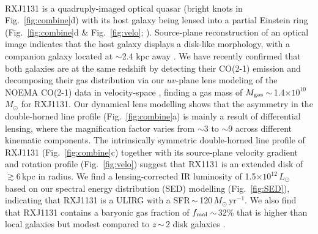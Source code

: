 \documentclass[11pt,a4paper,twoside,graphicx,color]{article}
\newcommand{\Lsun}{\mbox{$L_{\odot}$}\xspace}
\newcommand{\LIR}{\mbox{$L_{\rm IR}$}\xspace}
\newcommand{\Msun}{\mbox{$M_{\odot}$}\xspace}
\newcommand{\sfrU}{\mbox{\Msun\,yr$^{-1}$}\xspace}
\newcommand{\bco}{\mbox{CO(2-1)}\xspace}
\newcommand{\Fig}[1]{Fig.~\ref{fig:#1}}
\newcommand{\E}[1]{\mbox{$\times10^{#1}$}}
\newcommand{\eq}{\,=\,}
\newcommand{\ssim}{\,$\sim$\,}
\begin{document}
\vspace{0.2em}
\\
\indent 
RXJ1131 is a quadruply-imaged optical quasar (bright knots in \Fig{combine}d) 
with its host galaxy being lensed
into a partial Einstein ring (\Fig{combine}d \& \Fig{velo}; \citealt{Sluse03a}). 
Source-plane reconstruction 
of an optical image indicates that the host galaxy displays a disk-like morphology, with
a companion galaxy located at $\sim$2.4 kpc away 
\citep[\Fig{combine}f;][]{Claeskens06a, Brewer08a}.
We have recently confirmed that both galaxies are at the same redshift by detecting their
\bco emission and decomposing their gas distribution
via our $uv$-plane lens modeling
of the NOEMA \bco data
 in velocity-space \citep[\Fig{combine}c \& e;][]{Leung16b}, finding a gas mass of 
$M_{\rm gas}$\ssim1.4\E{10}\,\Msun for RXJ1131.
Our dynamical lens modelling 
shows that the asymmetry in the double-horned line profile (\Fig{combine}a)
is mainly a result of differential lensing, where
the magnification factor varies from $\sim$3 to $\sim$9 across
different kinematic components.
The intrinsically symmetric double-horned line
profile of RXJ1131 (\Fig{combine}c) together with its source-plane velocity gradient 
and rotation profile (\Fig{velo}) 
suggest that RX1131 is an extended disk of $\gtrsim$6\,kpc in radius.
We find a lensing-corrected IR luminosity of 1.5\E{12}\,\Lsun based
on our spectral energy distribution (SED) modelling (\Fig{SED}), 
indicating that RXJ1131 is a ULIRG with a SFR\ssim120\,\sfrU.
We also find that
RXJ1131 contains  
a baryonic gas fraction of $f_{\rm mol}$\ssim32\%
that is higher than local galaxies but modest compared to $z$\ssim2 disk galaxies \citep{Daddi10a}.
\end{document}
